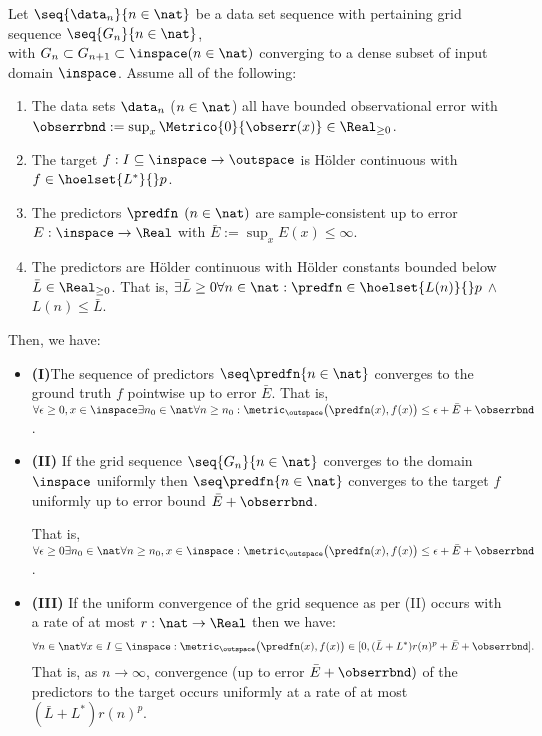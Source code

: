 \begin{thm} \label{thm:convergenceifboundedconstandsamplecons}
Let $\seq{\data_n}{n \in \nat}$ be a data set sequence with pertaining grid sequence $\seq{G_n}{n \in \nat}$, \\ with $G_n \subset G_{n+1} \subset \inspace (n \in \nat)$ converging to a dense subset of input domain $\inspace$. Assume all of the following: 
\begin{enumerate} 
\item The data sets $\data_n$ ($n \in \nat$) all have bounded observational error with $\obserrbnd := \sup_x \Metrico{0}{\obserr(x)} \in \Real_{\geq 0}$.
\item The target $f: I \subseteq \inspace \to \outspace$ is H\"older continuous with $f \in \hoelset {L^*}{}  p$.
\item The predictors $\predfn$ $(n \in \nat)$ are sample-consistent up to error $E:\inspace \to \Real$ with $\bar E := \sup_x E(x) \leq \infty$.
\item The predictors are  H\"older continuous with H\"older constants bounded below $\bar L \in \Real_{\geq0}$. That is, 
$\exists \bar L \geq 0 \forall n \in \nat: \predfn \in \hoelset {L(n)}{} p$  $ \wedge$ $ L(n) \leq \bar L$.
\end{enumerate}


Then, we have: 
\begin{itemize}
\item \textbf{(I)}The sequence of predictors $\seq \predfn {n \in \nat}$ converges to the ground truth $f$ pointwise up to error $\bar E$. That is, $\forall \epsilon \geq 0,  x \in \inspace \exists n_0 \in \nat \forall n \geq n_0: \metric_{\outspace}\bigl(\predfn(x), f(x) \bigr) \leq \epsilon + \bar E + \obserrbnd$.

\item \textbf{(II)} If the grid sequence $\seq{G_n}{n \in \nat }$ converges to the domain $\inspace$ uniformly then $\seq \predfn {n \in \nat}$ converges to the target $f$ uniformly up to error bound $\bar E + \obserrbnd$. 

That is, $\forall \epsilon \geq 0 \exists n_0 \in \nat \forall n \geq n_0, x \in \inspace: \metric_{\outspace}\bigl(\predfn(x), f(x) \bigr) \leq \epsilon + \bar E+\obserrbnd$.

\item \textbf{(III)} If the uniform convergence of the grid sequence as per (II) occurs with a rate of at most $r:\nat \to \Real$ then we have:  $$\forall n \in \nat \forall x \in I \subseteq\inspace: \metric_\outspace\bigl(\predfn(x) , f(x)\bigr)\in [0,(\bar L+ L^*) r(n)^p+ \bar E + \obserrbnd].$$ That is, as $n \to \infty$,  convergence (up to error $\bar E +\obserrbnd)$ of the predictors to the target occurs uniformly at a rate of at most $(\bar L+ L^*) r(n)^p$.
\end{itemize}


\end{thm}
